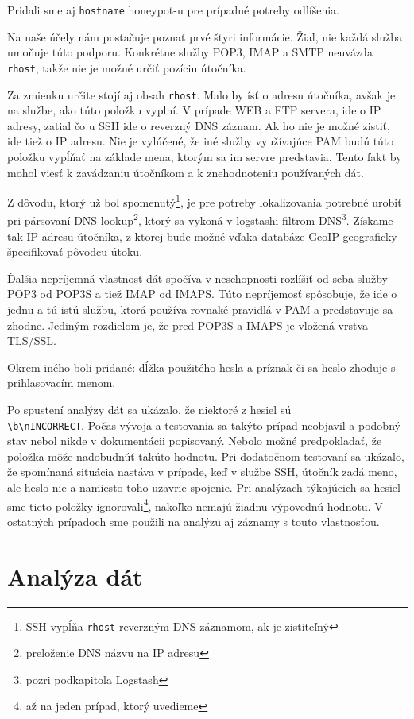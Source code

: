 \documentclass[12pt, oneside]{book}
\begin{document}
Pridali sme aj \texttt{hostname} honeypot-u pre prípadné potreby odlíšenia.

Na naše účely nám postačuje poznať prvé štyri informácie.
Žiaľ, nie každá služba umoňuje túto podporu.
Konkrétne služby POP3, IMAP a SMTP neuvázda \texttt{rhost}, takže nie je možné určiť pozíciu útočníka.

Za zmienku určite stojí aj obsah \texttt{rhost}. Malo by ísť o adresu útočníka, avšak je na službe, ako túto položku vyplní.
V prípade WEB a FTP servera, ide o IP adresy, zatial čo u SSH ide o reverzný DNS záznam.
Ak ho nie je možné zistiť, ide tiež o IP adresu.
Nie je vylúčené, že iné služby využívajúce PAM budú túto položku vypĺňať na základe mena, ktorým sa im servre predstavia.
Tento fakt by mohol viesť k zavádzaniu útočníkom a k znehodnoteniu používaných dát.

Z dôvodu, ktorý už bol spomenutý\footnote{SSH vypĺňa \texttt{rhost} reverzným DNS záznamom, ak je zistiteľný}, je pre potreby lokalizovania potrebné urobiť pri pársovaní DNS lookup\footnote{preloženie DNS názvu na IP adresu}, ktorý sa vykoná v logstashi filtrom DNS\footnote{pozri podkapitola Logstash}.
Získame tak IP adresu útočníka, z ktorej bude možné vďaka databáze GeoIP geograficky špecifikovať pôvodcu útoku.

Ďalšia nepríjemná vlastnosť dát spočíva v neschopnosti rozlíšiť od seba služby POP3 od POP3S a tiež IMAP od IMAPS.
Túto nepríjemosť spôsobuje, že ide o jednu a tú istú službu, ktorá používa rovnaké pravidlá v PAM a predstavuje sa zhodne.
Jediným rozdielom je, že pred POP3S a IMAPS je vložená vrstva TLS/SSL.

Okrem iného boli pridané: dĺžka použitého hesla a príznak či sa heslo zhoduje s prihlasovacím menom.

Po spustení analýzy dát sa ukázalo, že niektoré z hesiel sú \\\texttt{\textbackslash b\textbackslash nINCORRECT}.
Počas vývoja a testovania sa takýto prípad neobjavil a podobný stav nebol nikde v dokumentácii popisovaný.
Nebolo možné predpokladať, že položka môže nadobudnúť takúto hodnotu.
Pri dodatočnom testovaní sa ukázalo, že spomínaná situácia nastáva v prípade, keď v službe SSH, útočník zadá meno, ale heslo nie a namiesto toho uzavrie spojenie.
Pri analýzach týkajúcich sa hesiel sme tieto položky ignorovali\footnote{až na jeden prípad, ktorý uvedieme}, nakoľko nemajú žiadnu výpovednú hodnotu.
V ostatných prípadoch sme použili na analýzu aj záznamy s touto vlastnosťou.


\section{Analýza dát}
\end{document}
